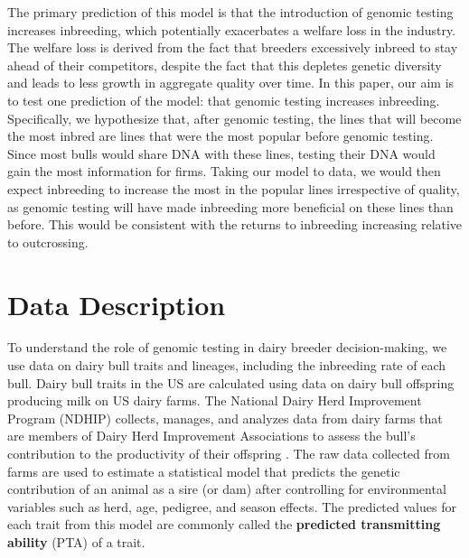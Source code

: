 \documentclass[12pt,letterpaper]{article}
\begin{document}
The primary prediction of this model is that the introduction of genomic testing increases inbreeding, which potentially exacerbates a welfare loss in the industry.
The welfare loss is derived from the fact that breeders excessively inbreed to stay ahead of their competitors, despite the fact that this depletes genetic diversity and leads to less growth in aggregate quality over time.
In this paper, our aim is to test one prediction of the model: that genomic testing increases inbreeding.
Specifically, we hypothesize that, after genomic testing, the lines that will become the most inbred are lines that were the most popular before genomic testing.
Since most bulls would share DNA with these lines, testing their DNA would gain the most information for firms.
Taking our model to data, we would then expect inbreeding to increase the most in the popular lines irrespective of quality, as genomic testing will have made inbreeding more beneficial on these lines than before.
This would be consistent with the returns to inbreeding increasing relative to outcrossing.


\section{Data Description\label{sec:data_description}}
To understand the role of genomic testing in dairy breeder decision-making, we use data on dairy bull traits and lineages, including the inbreeding rate of each bull.
Dairy bull traits in the US are calculated using data on dairy bull offspring producing milk on US dairy farms. The National Dairy Herd Improvement Program (NDHIP) collects, manages, and analyzes data from dairy farms that are members of Dairy Herd Improvement Associations to assess the bull's contribution to the productivity of their offspring \citep{Hutchins_Hueth2023}. The raw data collected from farms are used to estimate a statistical model that predicts the genetic contribution of an animal as a sire (or dam) after controlling for environmental variables such as herd, age, pedigree, and season effects. The predicted values for each trait from this model are commonly called the \textbf{predicted transmitting ability} (PTA) of a trait.
\end{document}
